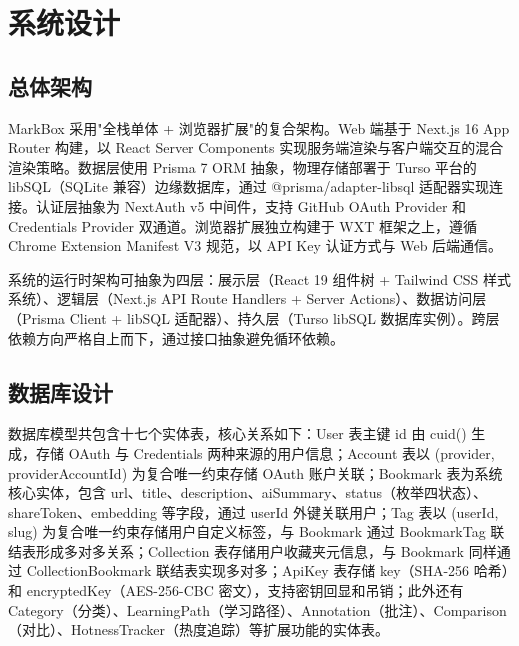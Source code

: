 \documentclass[a4paper,12pt]{ctexart}
\begin{document}
\section{系统设计}

\subsection{总体架构}

MarkBox 采用"全栈单体 + 浏览器扩展"的复合架构。Web 端基于 Next.js 16 App Router 构建，以 React Server Components 实现服务端渲染与客户端交互的混合渲染策略。数据层使用 Prisma 7 ORM 抽象，物理存储部署于 Turso 平台的 libSQL（SQLite 兼容）边缘数据库，通过 @prisma/adapter-libsql 适配器实现连接。认证层抽象为 NextAuth v5 中间件，支持 GitHub OAuth Provider 和 Credentials Provider 双通道。浏览器扩展独立构建于 WXT 框架之上，遵循 Chrome Extension Manifest V3 规范，以 API Key 认证方式与 Web 后端通信。

系统的运行时架构可抽象为四层：展示层（React 19 组件树 + Tailwind CSS 样式系统）、逻辑层（Next.js API Route Handlers + Server Actions）、数据访问层（Prisma Client + libSQL 适配器）、持久层（Turso libSQL 数据库实例）。跨层依赖方向严格自上而下，通过接口抽象避免循环依赖。


\subsection{数据库设计}

数据库模型共包含十七个实体表，核心关系如下：User 表主键 id 由 cuid() 生成，存储 OAuth 与 Credentials 两种来源的用户信息；Account 表以 (provider, providerAccountId) 为复合唯一约束存储 OAuth 账户关联；Bookmark 表为系统核心实体，包含 url、title、description、aiSummary、status（枚举四状态）、shareToken、embedding 等字段，通过 userId 外键关联用户；Tag 表以 (userId, slug) 为复合唯一约束存储用户自定义标签，与 Bookmark 通过 BookmarkTag 联结表形成多对多关系；Collection 表存储用户收藏夹元信息，与 Bookmark 同样通过 CollectionBookmark 联结表实现多对多；ApiKey 表存储 key（SHA-256 哈希）和 encryptedKey（AES-256-CBC 密文），支持密钥回显和吊销；此外还有 Category（分类）、LearningPath（学习路径）、Annotation（批注）、Comparison（对比）、HotnessTracker（热度追踪）等扩展功能的实体表。
\end{document}
